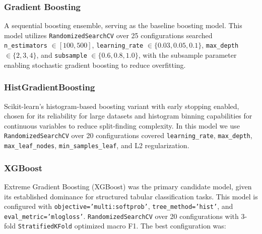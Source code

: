 \documentclass[11pt, onecolumn]{article}
\begin{document}
\subsubsection{Gradient Boosting}
A sequential boosting ensemble, serving as the baseline boosting model. This model utilizes \texttt{RandomizedSearchCV} over 25 configurations searched \texttt{n\_estimators} $\in [100, 500]$, \texttt{learning\_rate} $\in \{0.03, 0.05, 0.1\}$, \texttt{max\_depth} $\in \{2, 3, 4\}$, and \texttt{subsample} $\in \{0.6, 0.8, 1.0\}$, with the subsample parameter enabling stochastic gradient boosting to reduce overfitting.

\subsubsection{HistGradientBoosting}
Scikit-learn's histogram-based boosting variant with early stopping enabled, chosen for its reliability for large datasets and histogram binning capabilities for continuous variables to reduce split-finding complexity. In this model we use \texttt{RandomizedSearchCV} over 20 configurations covered \texttt{learning\_rate}, \texttt{max\_depth}, \texttt{max\_leaf\_nodes}, \texttt{min\_samples\_leaf}, and L2 regularization.

\subsubsection{XGBoost}
Extreme Gradient Boosting (XGBoost) was the primary candidate model, given its established dominance for structured tabular classification tasks. This model is configured with \texttt{objective='multi:softprob'}, \texttt{tree\_method='hist'}, and \texttt{eval\_metric='mlogloss'}. \texttt{RandomizedSearchCV} over 20 configurations with 3-fold \texttt{StratifiedKFold} optimized macro F1. The best configuration was:
\end{document}
